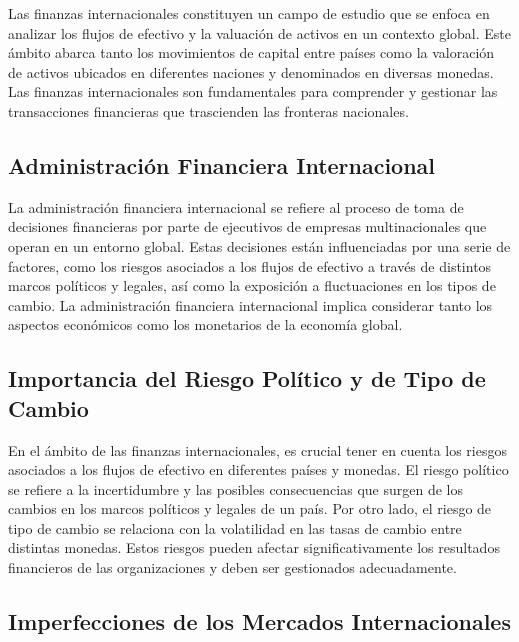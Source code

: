 \documentclass[
  a4paper,
]{article}
\begin{document}
Las finanzas internacionales constituyen un campo de estudio que se
enfoca en analizar los flujos de efectivo y la valuación de activos en
un contexto global. Este ámbito abarca tanto los movimientos de capital
entre países como la valoración de activos ubicados en diferentes
naciones y denominados en diversas monedas. Las finanzas internacionales
son fundamentales para comprender y gestionar las transacciones
financieras que trascienden las fronteras nacionales.

\subsection{Administración Financiera
Internacional}\label{administraciuxf3n-financiera-internacional}

La administración financiera internacional se refiere al proceso de toma
de decisiones financieras por parte de ejecutivos de empresas
multinacionales que operan en un entorno global. Estas decisiones están
influenciadas por una serie de factores, como los riesgos asociados a
los flujos de efectivo a través de distintos marcos políticos y legales,
así como la exposición a fluctuaciones en los tipos de cambio. La
administración financiera internacional implica considerar tanto los
aspectos económicos como los monetarios de la economía global.

\subsection{Importancia del Riesgo Político y de Tipo de
Cambio}\label{importancia-del-riesgo-poluxedtico-y-de-tipo-de-cambio}

En el ámbito de las finanzas internacionales, es crucial tener en cuenta
los riesgos asociados a los flujos de efectivo en diferentes países y
monedas. El riesgo político se refiere a la incertidumbre y las posibles
consecuencias que surgen de los cambios en los marcos políticos y
legales de un país. Por otro lado, el riesgo de tipo de cambio se
relaciona con la volatilidad en las tasas de cambio entre distintas
monedas. Estos riesgos pueden afectar significativamente los resultados
financieros de las organizaciones y deben ser gestionados adecuadamente.

\subsection{Imperfecciones de los Mercados
Internacionales}\label{imperfecciones-de-los-mercados-internacionales}
\end{document}
